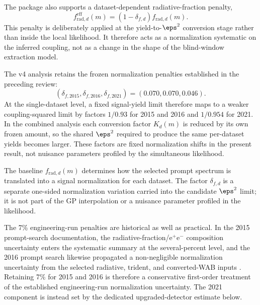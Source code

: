 The package also supports a dataset-dependent radiative-fraction penalty,
\begin{equation}
f_{\mathrm{rad},d}^{\mathrm{eff}}(m)
= \left(1-\delta_{f,d}\right) f_{\mathrm{rad},d}(m).
\label{eq:frad-penalty}
\end{equation}
This penalty is deliberately applied at the yield-to-$\eps^2$ conversion stage rather
than inside the local likelihood. It therefore acts as a normalization systematic on
the inferred coupling, not as a change in the shape of the blind-window extraction
model.

The v4 analysis retains the frozen normalization penalties established in the
preceding review:
\begin{equation}
(\delta_{f,2015},\delta_{f,2016},\delta_{f,2021})=(0.070,0.070,0.046).
\label{eq:frad-penalty-vector}
\end{equation}
At the single-dataset level, a fixed signal-yield limit therefore maps to a weaker
coupling-squared limit by factors $1/0.93$ for 2015 and 2016 and $1/0.954$ for 2021.
In the combined analysis each conversion factor $K_d(m)$ is reduced by its own frozen
amount, so the shared $\eps^2$ required to produce the same per-dataset yields becomes
larger. These factors are fixed normalization shifts in the present result, not nuisance
parameters profiled by the simultaneous likelihood.

The baseline $f_{\mathrm{rad},d}(m)$ determines how the selected prompt spectrum is
translated into a signal normalization for each dataset. The factor $\delta_{f,d}$ is a
separate one-sided normalization variation carried into the candidate $\eps^2$ limit;
it is not part of the GP interpolation or a nuisance parameter profiled in the
likelihood.

The 7\% engineering-run penalties are historical as well as practical. In the 2015
prompt-search documentation, the radiative-fraction/e$^+$e$^-$
composition uncertainty enters the systematic summary at the several-percent level, and
the 2016 prompt search likewise propagated a non-negligible normalization uncertainty
from the selected radiative, trident, and converted-WAB inputs
\cite{HPS2015InternalNote,HPS2016PromptLong}. Retaining 7\% for 2015 and 2016 is
therefore a conservative first-order treatment of the established engineering-run
normalization uncertainty. The 2021 component is instead set by the dedicated
upgraded-detector estimate below.

